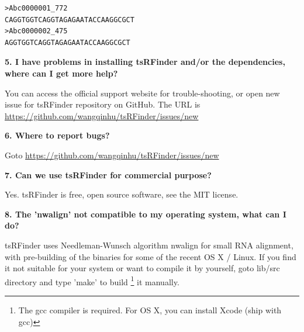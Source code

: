 \documentclass[11pt, a4paper]{article}
\begin{document}
{\scriptsize \begin{tcolorbox}[colback=blue!5!white,colframe=pink!75!black,title=sRNA example]
\begin{verbatim}
>Abc0000001_772
CAGGTGGTCAGGTAGAGAATACCAAGGCGCT
>Abc0000002_475
AGGTGGTCAGGTAGAGAATACCAAGGCGCT
\end{verbatim}
\end{tcolorbox}}


\textbf{5. I have problems in installing tsRFinder and/or the dependencies, where can I get more help?}

You can access the official support website for trouble-shooting, or open new issue for tsRFinder repository on GitHub. The URL is \url{https://github.com/wangqinhu/tsRFinder/issues/new}

\textbf{6. Where to report bugs?}

Goto \url{https://github.com/wangqinhu/tsRFinder/issues/new}

\textbf{7. Can we use tsRFinder for commercial purpose?}

Yes. tsRFinder is free, open source software, see the MIT license.

\textbf{8. The 'nwalign' not compatible to my operating system, what can I do?}
 
tsRFinder uses Needleman-Wunsch algorithm nwalign for small RNA alignment, with pre-building of the binaries for some of the recent OS X / Linux. If you find it not suitable for your system or want to compile it by yourself, goto lib/src directory and type 'make' to build \footnote{The gcc compiler is required. For OS X, you can install Xcode (ship with gcc)} it manually.
\end{document}
